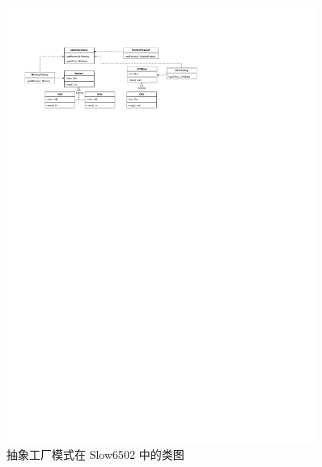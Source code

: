 \begin{figure}[htb]
  \centering
  \includegraphics[width=0.9\textwidth]{figures/抽象工厂.pdf}
  \caption{抽象工厂模式在 Slow6502 中的类图}
\end{figure}
